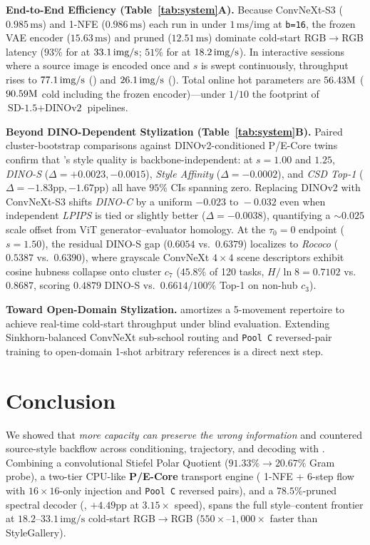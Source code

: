 \documentclass[conference]{IEEEtran}
\begin{document}
\textbf{End-to-End Efficiency (Table~\ref{tab:system}A).}
Because ConvNeXt-S3 ($0.985\,\text{ms}$) and 1-NFE \textbf{\methodecore} ($0.986\,\text{ms}$) each run in under $1\,\text{ms/img}$ at \texttt{b=16}, the frozen VAE encoder ($15.63\,\text{ms}$) and pruned \textbf{\methoddec} ($12.51\,\text{ms}$) dominate cold-start RGB$\to$RGB latency ($93\%$ for \textbf{\methodecore} at $33.1\,\text{img/s}$; $51\%$ for \textbf{\methodpcore} at $18.2\,\text{img/s}$). In interactive sessions where a source image is encoded once and $s$ is swept continuously, throughput rises to $77.1\,\text{img/s}$ (\textbf{\methodecore}) and $26.1\,\text{img/s}$ (\textbf{\methodpcore}). Total online hot parameters are $56.43\text{M}$ ($90.59\text{M}$ cold including the frozen encoder)---under $1/10$ the footprint of $\text{SD-1.5}+\text{DINOv2}$ pipelines.

\textbf{Beyond DINO-Dependent Stylization (Table~\ref{tab:system}B).}
Paired cluster-bootstrap comparisons against DINOv2-conditioned P/E-Core twins confirm that \textbf{\method}'s style quality is backbone-independent: at $s=1.00$ and $1.25$, \emph{DINO-S} ($\Delta=+0.0023, -0.0015$), \emph{Style Affinity} ($\Delta=-0.0002$), and \emph{CSD Top-1} ($\Delta=-1.83\text{pp}, -1.67\text{pp}$) all have $95\%$ CIs spanning zero. Replacing DINOv2 with ConvNeXt-S3 shifts \emph{DINO-C} by a uniform $-0.023\text{ to }-0.032$ even when independent \emph{LPIPS} is tied or slightly better ($\Delta=-0.0038$), quantifying a $\sim 0.025$ scale offset from ViT generator--evaluator homology. At the $\tau_0=0$ endpoint ($s=1.50$), the residual DINO-S gap ($0.6054$ vs.\ $0.6379$) localizes to \emph{Rococo} ($0.5387$ vs.\ $0.6390$), where grayscale ConvNeXt $4\times 4$ scene descriptors exhibit cosine hubness collapse onto cluster $c_7$ ($45.8\%$ of 120 tasks, $H/\ln 8=0.7102$ vs.\ $0.8687$, scoring $0.4879$ DINO-S vs.\ $0.6614 / 100\%$ Top-1 on non-hub $c_3$).

\textbf{Toward Open-Domain Stylization.}
\textbf{\method} amortizes a 5-movement repertoire to achieve real-time cold-start throughput under blind evaluation. Extending Sinkhorn-balanced ConvNeXt sub-school routing and \texttt{Pool C} reversed-pair training to open-domain 1-shot arbitrary references is a direct next step.

\section{Conclusion}
\label{sec:conclusion}

We showed that \emph{more capacity can preserve the wrong information} and countered source-style backflow across conditioning, trajectory, and decoding with \textbf{\method}. Combining a convolutional Stiefel Polar Quotient ($91.33\%\!\to\!20.67\%$ Gram probe), a two-tier CPU-like \textbf{P/E-Core} transport engine (\textbf{\methodecore} 1-NFE + \textbf{\methodpcore} 6-step flow with $16\times 16$-only injection and \texttt{Pool C} reversed pairs), and a $78.5\%$-pruned spectral decoder (\textbf{\methoddec}, $+4.49\text{pp}$ at $3.15\times$ speed), \textbf{\method} spans the full style--content frontier at $18.2\text{--}33.1\,\text{img/s}$ cold-start RGB$\to$RGB ($550\times\text{--}1{,}000\times$ faster than StyleGallery).

\let\oldthebibliography\thebibliography
\renewcommand{\thebibliography}[1]{\oldthebibliography{#1}\scriptsize\setlength{\itemsep}{0pt}\setlength{\parskip}{0pt}\renewcommand{\baselinestretch}{0.91}\selectfont}


\end{document}
